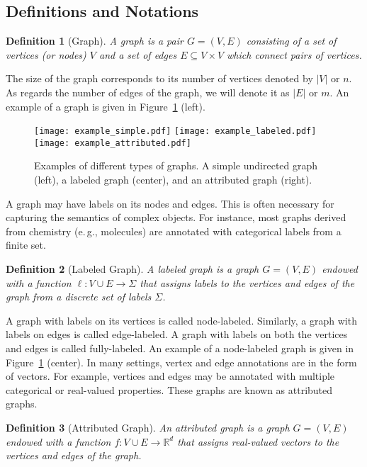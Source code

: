\documentclass[twoside,11pt]{article}
\newcommand{\eg}{e.\,g., }
\newtheorem{definition}{Definition}
\begin{document}
\subsection{Definitions and Notations}
\begin{definition}[Graph]
    A graph is a pair $G=(V,E)$ consisting of a set of vertices (or nodes) $V$ and a set of edges $E \subseteq V \times V$ which connect pairs of vertices. 
\end{definition}
The size of the graph corresponds to its number of vertices denoted by $|V|$ or $n$.
As regards the number of edges of the graph, we will denote it as $|E|$ or $m$.
An example of a graph is given in Figure~\ref{fig:example_graphs} (left).
\begin{figure}[t]
    \centering
    \subfloat
    {\texttt{[image: example\_simple.pdf]}} \qquad \qquad
    \subfloat
    {\texttt{[image: example\_labeled.pdf]}} \qquad \qquad
    \subfloat
    {\texttt{[image: example\_attributed.pdf]}} 
    \caption{Examples of different types of graphs. A simple undirected graph (left), a labeled graph (center), and an attributed graph (right).}
    \label{fig:example_graphs}
\end{figure}
A graph may have labels on its nodes and edges.
This is often necessary for capturing the semantics of complex objects.
For instance, most graphs derived from chemistry (\eg molecules) are annotated with categorical labels from a finite set.
\begin{definition}[Labeled Graph]
    A labeled graph is a graph $G=(V,E)$ endowed with a function $\ell : V \cup E \rightarrow \Sigma$ that assigns labels to the vertices and edges of the graph from a discrete set of labels $\Sigma$.
\end{definition}
A graph with labels on its vertices is called node-labeled.
Similarly, a graph with labels on edges is called edge-labeled. 
A graph with labels on both the vertices and edges is called fully-labeled.
An example of a node-labeled graph is given in Figure~\ref{fig:example_graphs} (center).
In many settings, vertex and edge annotations are in the form of vectors.
For example, vertices and edges may be annotated with multiple categorical or real-valued properties.
These graphs are known as attributed graphs.
\begin{definition}[Attributed Graph]
    An attributed graph is a graph $G=(V,E)$ endowed with a function $f : V \cup E \rightarrow \mathbb{R}^d$ that assigns real-valued vectors to the vertices and edges of the graph.
\end{definition}
\end{document}
